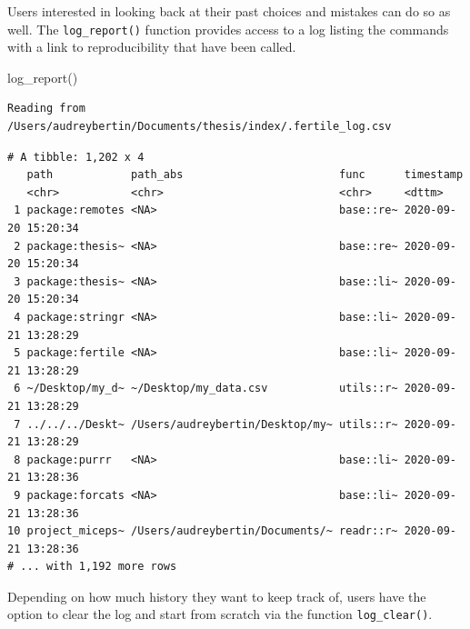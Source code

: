 \documentclass[12pt,twoside]{reedthesis}
\newenvironment{Shaded}{\begin{snugshade}}{\end{snugshade}}
\newcommand{\FunctionTok}[1]{\textcolor[rgb]{0.00,0.00,0.00}{#1}}
\newcommand{\NormalTok}[1]{#1}
\begin{document}
Users interested in looking back at their past choices and mistakes can do so as well. The \texttt{log\_report()} function provides access to a log listing the commands with a link to reproducibility that have been called.
\begin{Shaded}
\begin{Highlighting}[]
\FunctionTok{log\_report}\NormalTok{()}
\end{Highlighting}
\end{Shaded}
\footnotesize
\begin{verbatim}
Reading from /Users/audreybertin/Documents/thesis/index/.fertile_log.csv
\end{verbatim}
\begin{verbatim}
# A tibble: 1,202 x 4
   path            path_abs                        func      timestamp          
   <chr>           <chr>                           <chr>     <dttm>             
 1 package:remotes <NA>                            base::re~ 2020-09-20 15:20:34
 2 package:thesis~ <NA>                            base::re~ 2020-09-20 15:20:34
 3 package:thesis~ <NA>                            base::li~ 2020-09-20 15:20:34
 4 package:stringr <NA>                            base::li~ 2020-09-21 13:28:29
 5 package:fertile <NA>                            base::li~ 2020-09-21 13:28:29
 6 ~/Desktop/my_d~ ~/Desktop/my_data.csv           utils::r~ 2020-09-21 13:28:29
 7 ../../../Deskt~ /Users/audreybertin/Desktop/my~ utils::r~ 2020-09-21 13:28:29
 8 package:purrr   <NA>                            base::li~ 2020-09-21 13:28:36
 9 package:forcats <NA>                            base::li~ 2020-09-21 13:28:36
10 project_miceps~ /Users/audreybertin/Documents/~ readr::r~ 2020-09-21 13:28:36
# ... with 1,192 more rows
\end{verbatim}
\normalsize

Depending on how much history they want to keep track of, users have the option to clear the log and start from scratch via the function \texttt{log\_clear()}.
\end{document}
